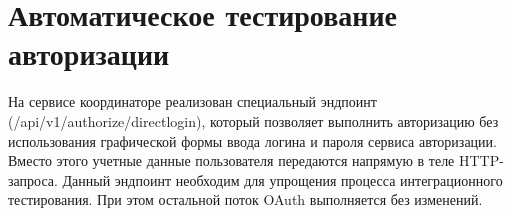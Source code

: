 \section{Автоматическое тестирование авторизации}

На сервисе координаторе реализован специальный эндпоинт (/api/v1/authorize/directlogin), который позволяет выполнить авторизацию без использования графической формы ввода логина и пароля сервиса авторизации. Вместо этого учетные данные пользователя передаются напрямую в теле HTTP-запроса. Данный эндпоинт необходим для упрощения процесса интеграционного тестирования. При этом остальной поток OAuth выполняется без изменений.